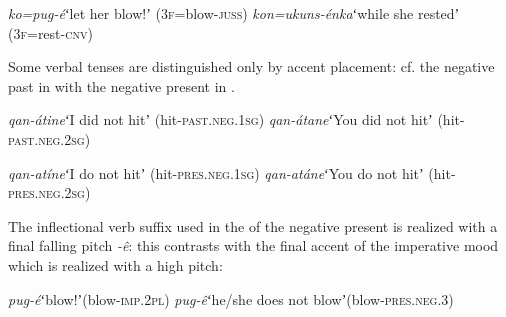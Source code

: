 \documentclass[output=paper,modfonts,nonflat,hidelinks]{langsci/langscibook}
\begin{document}
\begin{exe}
\ex \begin{xlist}
\ex \textit{ko=pug-é}\hspace{11mm}ʻlet her blow!ʼ (3\textsc{f}=blow-\textsc{juss}) \label{ex:Petrollino:kopugé}
\ex \textit{kon=ukuns-énka}\hspace{1mm}ʻwhile she restedʼ (3\textsc{f}=rest-\textsc{cnv}) \label{ex:Petrollino:konuskenka}
\end{xlist}
\end{exe}

Some verbal tenses are distinguished only by accent placement: cf. the negative past in  with the negative present in . 

\begin{exe}
\ex \begin{xlist}
\ex \textit{qan-átine}\hspace{8mm}ʻI did not hitʼ (hit-\textsc{past}.\textsc{neg}.1\textsc{sg}) 
\ex \textit{qan-átane}\hspace{8mm}ʻYou did not hitʼ (hit-\textsc{past}.\textsc{neg}.2\textsc{sg})
\end{xlist}\label{ex:Petrollino:NEGPast}
\end{exe} 

\begin{exe}
\ex \begin{xlist}
\ex \textit{qan-atíne}\hspace{8mm}ʻI do not hitʼ (hit-\textsc{pres}.\textsc{neg}.1\textsc{sg}) 
\ex \textit{qan-atáne}\hspace{8mm}ʻYou do not hitʼ (hit-\textsc{pres}.\textsc{neg}.2\textsc{sg}) 
\end{xlist}\label{ex:Petrollino:NEGPres}
\end{exe} 

The inflectional verb suffix used in the  of the negative present is realized with a final falling pitch \textit{-ê}: this contrasts with the final accent of the imperative mood which is realized with a high pitch:

\begin{exe}
\ex \begin{xlist} \label{ex:Petrollino:IMPNEG}
\ex \textit{pug-é}\hspace{15mm}ʻblow!ʼ\hspace{40mm}(blow-\textsc{imp}.2\textsc{pl})
\ex \textit{pug-ê}\hspace{15mm}ʻhe/she does not blowʼ\hspace{16mm}(blow-\textsc{pres}.\textsc{neg}.3)
\end{xlist}
\end{exe}
\end{document}
